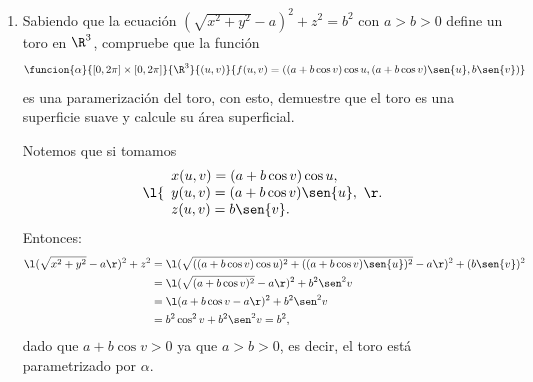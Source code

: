 \documentclass[a4,11pt]{aleph-examen}
\begin{document}
\begin{preguntas}
\begin{respuesta}
\begin{respuesta}
\begin{respuesta}
\begin{enumerate}
\begin{respuesta}
    La intersección del paraboloide y el plano es
    \[
        x^2+z^2=2a^2,
    \]
    esto representa la región de integración T sobre el plano xz.  la superficie
    \[
        \funcion{f}{\R^2}{\R}{(x,z)}{\dfrac{1}{2a}(x^2+z^2)}.
    \]
    Como la superficie $S$ está dada en forma explícita $y=f(x,z)$
    \[
        \parallel \dfrac{\partial r}{\partial x} \times \dfrac{\partial r}{\partial z}\parallel = \sqrt[]{1+(\dfrac{\partial f}{\partial x})^2+(\dfrac{\partial f}{\partial z})^2}=\sqrt[]{1+\dfrac{x^2+z^2}{a^2}}.
    \]
    Sea el cambio de variable,
    \begin{align*}
        x&=r \cos \theta\\
        y&=r \sen \theta,
    \end{align*}
    donde
    \begin{align*}
        \theta\leq r\leq a \sqrt[]{2}\\
        0 \leq \theta \leq 2\pi.
    \end{align*}
    \[
        a(S)=\int \int_T \parallel \dfrac{\partial r}{\partial x} X \dfrac{\partial r}{\partial z}\parallel dx dy = \int_0^{2 \pi} \left[ \int_0^{a\sqrt[]{2}}\sqrt[]{1+\dfrac{r^2}{a^2}}\ r dr \right] d\theta=\dfrac{2}{3} \pi a^2 (3\sqrt[]{3} -1 ).
    \]
\end{respuesta}
\item 
    Sabiendo que la ecuación $(\sqrt{x^2 + y^2} -a)^2 + z^2 = b^2$ con $a>b>0$ define un toro en $\R^3$, compruebe que la función
    \[
        \funcion{\alpha}{[0,2\pi]\times[0,2\pi]}{\R^3}
        {(u,v)}{f(u,v)=((a +b\cos{v})\cos{u},(a +b\cos{v})\sen{u},b\sen{v})}
	\]
    es una paramerización del toro, con esto, demuestre que el toro es una superficie suave y calcule su área superficial.
    
\begin{respuesta}
    Notemos que si tomamos 
    \[
        \l\{
        \begin{array}{l}
            x(u,v) = (a +b\cos{v})\cos{u},\\
            y(u,v) = (a +b\cos{v})\sen{u},\\
            z(u,v) = b\sen{v}.
        \end{array}
        \r.
    \]
    Entonces:
    \begin{align*}
        \l(\sqrt{x^2 + y^2} -a\r)^2 + z^2 &= \l(\sqrt{((a +b\cos{v})\cos{u})^2+((a +b\cos{v})\sen{u})^2}-a\r)^2+(b\sen{v})^2\\
            &= \l(\sqrt{(a +b\cos{v})^2}-a\r)^2+b^2\sen^2{v}\\
            &= \l(a+b\cos{v}-a\r)^2+b^2\sen^2{v}\\
            &= b^2\cos^2{v}+b^2\sen^2{v}=b^2,
    \end{align*}
    dado que $a+b\cos{v}>0$ ya que $a>b>0$, es decir, el toro está parametrizado por $\alpha$.
    

\end{respuesta}
\end{enumerate}
\end{respuesta}
\end{respuesta}
\end{respuesta}
\end{preguntas}
\end{document}
